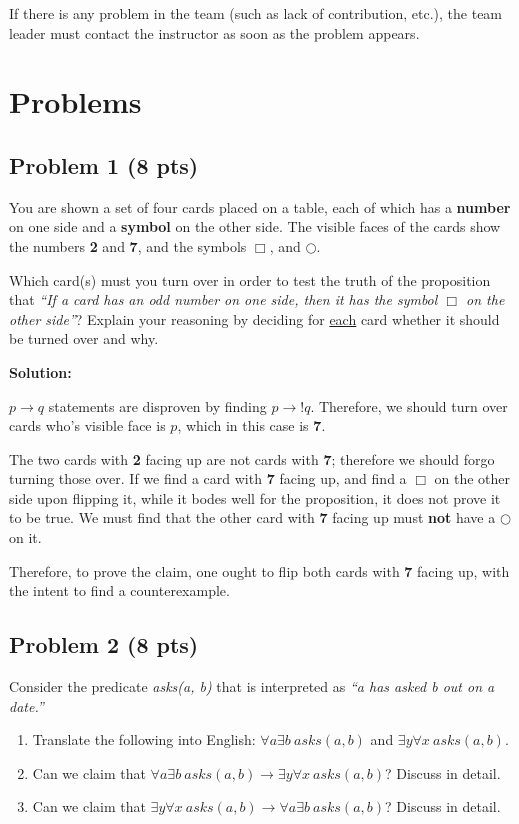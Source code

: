 \documentclass[12pt]{article}
\begin{document}
\noindent If there is any problem in the team (such as lack of contribution, etc.), the team leader must contact the instructor as soon as the problem appears.

\newpage

\section{Problems}

\subsection{Problem 1 (8 pts)}

\noindent You are shown a set of four cards placed on a table, each of which has a \textbf{number} on one side and a \textbf{symbol} on the other side. The visible faces of the cards show the numbers \textbf{2} and \textbf{7}, and the symbols \textbf{$\Box$}, and \textbf{$\bigcirc$}.

\bigskip
\noindent Which card(s) must you turn over in order to test the truth of the proposition that \textit{``If a card has an odd number on one side, then it has the symbol $\Box$ on the other side''}? Explain your reasoning by deciding for \underline{each} card whether it should be turned over and why.

\bigskip
\noindent\textbf{Solution:}

$p \rightarrow q$ statements are disproven by finding $p \rightarrow !q$. Therefore, we should turn over cards who's visible face is $p$, which in this case is \textbf{7}.

The two cards with \textbf{2} facing up are not cards with \textbf{7}; therefore we should forgo turning those over. If we find a card with \textbf{7} facing up, and find a $\Box$ on the other side upon flipping it, while it bodes well for the proposition, it does not prove it to be true. We must find that the other card with \textbf{7} facing up must \textbf{not} have a $\bigcirc$ on it.

Therefore, to prove the claim, one ought to flip both cards with \textbf{7} facing up, with the intent to find a counterexample. 

\newpage

\subsection{Problem 2 (8 pts)}

Consider the predicate \textit{asks(a, b)} that is interpreted as \textit{``a has asked b out on a date.''}
\begin{enumerate}
\item Translate the following into English: $\forall a \exists b~asks(a, b)$ and $\exists y \forall x ~asks(a, b)$.
\item Can we claim that $\forall a \exists b~asks(a, b) \rightarrow \exists y \forall x ~asks(a, b)$? Discuss in detail.
\item Can we claim that $\exists y \forall x ~asks(a, b) \rightarrow \forall a \exists b~asks(a, b)$? Discuss in detail.
\end{enumerate}
\end{document}
